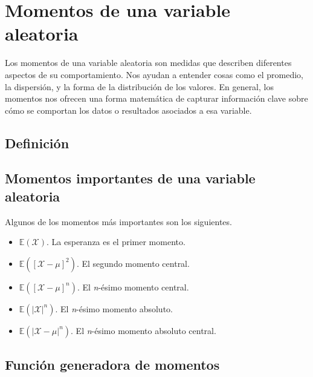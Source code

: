 \chapter{Momentos de una variable aleatoria}

Los momentos de una variable aleatoria son medidas que describen diferentes aspectos de su comportamiento. Nos ayudan a entender cosas como el promedio, la dispersión, y la forma de la distribución de los valores. En general, los momentos nos ofrecen una forma matemática de capturar información clave sobre cómo se comportan los datos o resultados asociados a esa variable.

\section{Definición}

\section{Momentos importantes de una variable aleatoria}
Algunos de los momentos más importantes son los siguientes.
\begin{itemize}
  \item $\mathbb E(\mathcal X)$. La esperanza es el primer momento.
  \item $\mathbb E([\mathcal X - \mu]^2)$. El segundo momento central.
  \item $\mathbb E([\mathcal X - \mu]^n)$. El \textit{n}-ésimo momento central.
  \item $\mathbb E(|\mathcal X |^n)$. El \textit{n}-ésimo momento absoluto.
  \item $\mathbb E(|\mathcal X - \mu|^n)$. El \textit{n}-ésimo momento absoluto central.
\end{itemize}

\section{Función generadora de momentos}



